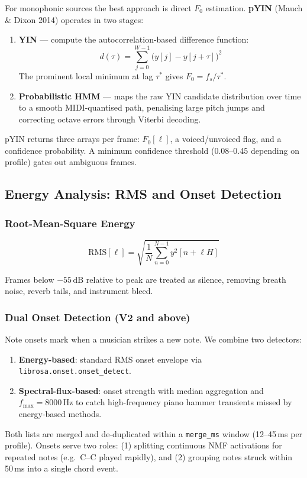 \documentclass[12pt, a4paper]{article}
\begin{document}
For monophonic sources the best approach is direct $F_0$ estimation.
\textbf{pYIN} (Mauch \& Dixon 2014) operates in two stages:

\begin{enumerate}[leftmargin=2em]
  \item \textbf{YIN} --- compute the autocorrelation-based difference function:
    \begin{equation}
      d(\tau) = \sum_{j=0}^{W-1}\bigl(y[j] - y[j+\tau]\bigr)^2
    \end{equation}
    The prominent local minimum at lag $\tau^*$ gives $F_0 = f_s/\tau^*$.
  \item \textbf{Probabilistic HMM} --- maps the raw YIN candidate distribution
    over time to a smooth MIDI-quantised path, penalising large pitch jumps and
    correcting octave errors through Viterbi decoding.
\end{enumerate}

pYIN returns three arrays per frame: $F_0[\ell]$, a voiced/unvoiced flag,
and a confidence probability. A minimum confidence threshold (0.08--0.45
depending on profile) gates out ambiguous frames.

\subsection{Energy Analysis: RMS and Onset Detection}

\subsubsection{Root-Mean-Square Energy}

\begin{equation}
  \text{RMS}[\ell] = \sqrt{\frac{1}{N}\sum_{n=0}^{N-1}y^2[n+\ell H]}
\end{equation}

Frames below $-55\,\text{dB}$ relative to peak are treated as silence,
removing breath noise, reverb tails, and instrument bleed.

\subsubsection{Dual Onset Detection (V2 and above)}

Note onsets mark when a musician strikes a new note. We combine two detectors:
\begin{enumerate}[leftmargin=2em]
  \item \textbf{Energy-based}: standard RMS onset envelope via
        \texttt{librosa.onset.onset\_detect}.
  \item \textbf{Spectral-flux-based}: onset strength with median aggregation
        and $f_{\max}=8000\,\text{Hz}$ to catch high-frequency piano
        hammer transients missed by energy-based methods.
\end{enumerate}
Both lists are merged and de-duplicated within a \texttt{merge\_ms} window
(12--45\,ms per profile). Onsets serve two roles: (1) splitting continuous
NMF activations for repeated notes (e.g.\ C--C played rapidly), and (2)
grouping notes struck within 50\,ms into a single chord event.
\end{document}
